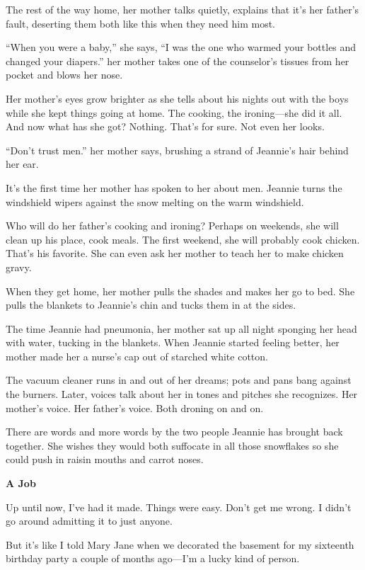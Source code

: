 \documentclass[
]{article}
\begin{document}
The rest of the way home, her mother talks quietly, explains that it's
her father's fault, deserting them both like this when they need him
most.

``When you were a baby,'' she says, ``I was the one who warmed your
bottles and changed your diapers.'' her mother takes one of the
counselor's tissues from her pocket and blows her nose.

Her mother's eyes grow brighter as she tells about his nights out with
the boys while she kept things going at home. The cooking, the
ironing---she did it all. And now what has she got? Nothing. That's for
sure. Not even her looks.

``Don't trust men.'' her mother says, brushing a strand of Jeannie's
hair behind her ear.

It's the first time her mother has spoken to her about men. Jeannie
turns the windshield wipers against the snow melting on the warm
windshield.

Who will do her father's cooking and ironing? Perhaps on weekends, she
will clean up his place, cook meals. The first weekend, she will
probably cook chicken. That's his favorite. She can even ask her mother
to teach her to make chicken gravy.

When they get home, her mother pulls the shades and makes her go to bed.
She pulls the blankets to Jeannie's chin and tucks them in at the sides.

The time Jeannie had pneumonia, her mother sat up all night sponging her
head with water, tucking in the blankets. When Jeannie started feeling
better, her mother made her a nurse's cap out of starched white cotton.

The vacuum cleaner runs in and out of her dreams; pots and pans bang
against the burners. Later, voices talk about her in tones and pitches
she recognizes. Her mother's voice. Her father's voice. Both droning on
and on.

There are words and more words by the two people Jeannie has brought
back together. She wishes they would both suffocate in all those
snowflakes so she could push in raisin mouths and carrot noses.

\textbf{A Job}

Up until now, I've had it made. Things were easy. Don't get me wrong. I
didn't go around admitting it to just anyone.

But it's like I told Mary Jane when we decorated the basement for my
sixteenth birthday party a couple of months ago---I'm a lucky kind of
person.
\end{document}
